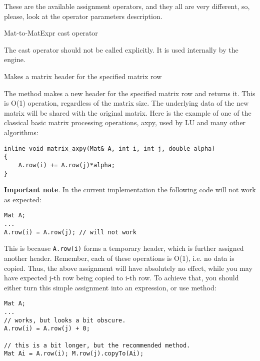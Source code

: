 These are the available assignment operators, and they all are very different, so, please, look at the operator parameters description. 

\label{cppfunc.Mat::operator MatExpr}
Mat-to-MatExpr cast operator


The cast operator should not be called explicitly. It is used internally by the  engine.

Makes a matrix header for the specified matrix row

\begin{description}
\end{description}

The method makes a new header for the specified matrix row and returns it. This is O(1) operation, regardless of the matrix size. The underlying data of the new matrix will be shared with the original matrix. Here is the example of one of the classical basic matrix processing operations, axpy, used by LU and many other algorithms:

\begin{lstlisting}
inline void matrix_axpy(Mat& A, int i, int j, double alpha)
{
    A.row(i) += A.row(j)*alpha;
}
\end{lstlisting}

\textbf{Important note}. In the current implementation the following code will not work as expected:
\begin{lstlisting}
Mat A;
...
A.row(i) = A.row(j); // will not work
\end{lstlisting}

This is because \texttt{A.row(i)} forms a temporary header, which is further assigned another header. Remember, each of these operations is O(1), i.e. no data is copied. Thus, the above assignment will have absolutely no effect, while you may have expected j-th row being copied to i-th row. To achieve that, you should either turn this simple assignment into an expression, or use  method:

\begin{lstlisting}
Mat A;
...
// works, but looks a bit obscure.
A.row(i) = A.row(j) + 0;

// this is a bit longer, but the recommended method.
Mat Ai = A.row(i); M.row(j).copyTo(Ai);
\end{lstlisting}


